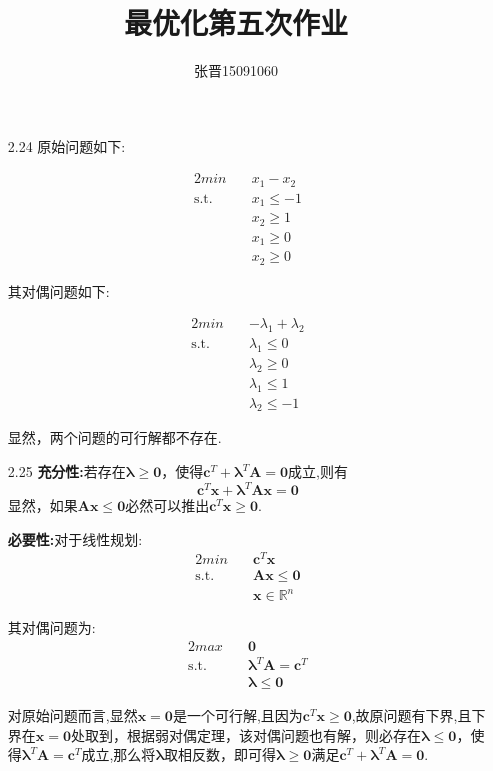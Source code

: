 \documentclass[UTF8]{ctexart}
\title{\heiti 最优化第五次作业}
\author{\kaishu 张晋15091060}
\begin{document}
\maketitle
\begin{enumerate}
\item[2.24] 原始问题如下:

\begin{alignat}{2}
min \quad & x_1-x_2 \nonumber\\
\mbox{s.t.}\quad
&x_1\leq-1\nonumber\\
&x_2\geq 1\nonumber\\
&x_1\geq 0\nonumber\\
&x_2\geq 0
\end{alignat}

其对偶问题如下:

\begin{alignat}{2}
min \quad & -\lambda_1+\lambda_2 \nonumber\\
\mbox{s.t.}\quad
&\lambda_1\leq 0\nonumber\\
&\lambda_2\geq 0\nonumber\\
&\lambda_1\leq 1\nonumber\\
&\lambda_2\leq -1
\end{alignat}

显然，两个问题的可行解都不存在.

\clearpage
\item[2.25]
\textbf{充分性:}若存在$\bm{\lambda}\geq \bm{0}$，使得$\bm{c}^T+\bm{\lambda}^T\bm{A}= \bm{0}$成立,则有\[\bm{c}^T\bm{x}+\bm{\lambda}^T\bm{A}\bm{x}= \bm{0}\]
显然，如果$\bm{A}\bm{x}\leq \bm{0}$必然可以推出$\bm{c}^T\bm{x}\geq \bm{0}$.

\textbf{必要性:}对于线性规划:
\begin{alignat}{2}
min \quad & \bm{c}^T\bm{x} \nonumber\\
\mbox{s.t.}\quad &
\bm{A}\bm{x}\leq \bm{0} \nonumber\\
& \bm{x}\in \mathbb{R}^n
\end{alignat}

其对偶问题为:
\begin{alignat}{2}
max \quad & \bm{0} \nonumber\\
\mbox{s.t.}\quad &
\bm{\lambda}^T\bm{A}=\bm{c}^T \nonumber\\
&\bm{\lambda} \leq \bm{0}
\end{alignat}

对原始问题而言,显然$\bm{x}=\bm{0}$是一个可行解,且因为$\bm{c}^T\bm{x} \geq \bm{0}$,故原问题有下界,且下界在$\bm{x}=\bm{0}$处取到，根据弱对偶定理，该对偶问题也有解，则必存在$\bm{\lambda}\leq \bm{0}$，使得$\bm{\lambda}^T\bm{A}=\bm{c}^T$成立,那么将$\bm{\lambda}$取相反数，即可得$\bm{\lambda}\geq \bm{0}$满足$\bm{c}^T+\bm{\lambda}^T\bm{A}= \bm{0}$.



\end{enumerate}
\end{document}
